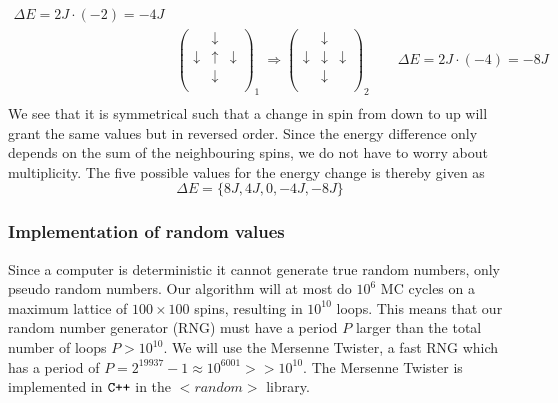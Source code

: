 \documentclass[%
 reprint,
nofootinbib,
aps,
]{revtex4-1}
\begin{document}
\begin{align*}
    \Delta E = 2J\cdot(-2) = -4J& \\
    &\begin{pmatrix} &\downarrow&\\ \downarrow&\uparrow&\downarrow\\ &\downarrow&\\\end{pmatrix}_1 \ \Longrightarrow
    \begin{pmatrix} &\downarrow&\\ \downarrow&\downarrow&\downarrow\\ &\downarrow&\\\end{pmatrix}_2 \qquad
    \Delta E = 2J\cdot(-4) = -8J& \\
\end{align*}
We see that it is symmetrical such that a change in spin from down to up will grant the same values but in reversed order. Since the energy difference only depends on the sum of the neighbouring spins, we do not have to worry about multiplicity. The five possible values for the energy change is thereby given as
\begin{equation}
    \Delta E = \{8J, 4J, 0, -4J, -8J\}
    \label{eq:Delta_E_list}
\end{equation}
\newpage
\subsubsection{Implementation of random values}
Since a computer is deterministic it cannot generate true random numbers, only pseudo random numbers. Our algorithm will at most do $10^6$ MC cycles on a maximum lattice of $100 \times 100$ spins, resulting in $10^{10}$ loops. This means that our random number generator (RNG) must have a period $P$ larger than the total number of loops $P > 10^{10}$. We will use the Mersenne Twister, a fast RNG which has a period of $P = 2^{19937}-1 \approx 10^{6001} >> 10^{10}$. The Mersenne Twister is implemented in $\verb!C++!$ in the $<random>$ library.
\end{document}
